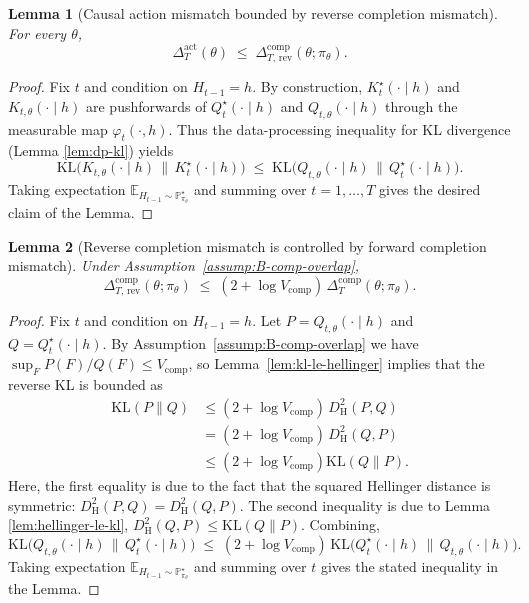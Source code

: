 \documentclass[11pt]{article}
\newtheorem{lemma}{Lemma}
\renewcommand{\P}{\mathbb{P}}
\providecommand{\E}{\mathbb{E}}
\begin{document}
\begin{lemma}[Causal action mismatch bounded by reverse completion mismatch]
\label{lemma:B12-act-by-rev-comp}
For every \(\theta\),
\[
\Delta_{T}^{\mathrm{act}}(\theta)
\;\le\;
\Delta^{\mathrm{comp}}_{T, \, \mathrm{rev}}(\theta;\pi_\theta).
\]
\end{lemma}

\begin{proof}
Fix \(t\) and condition on \(H_{t-1}=h\).
By construction, \(K^\star_t(\cdot\mid h)\) and \(K_{t,\theta}(\cdot\mid h)\) are pushforwards of
\(Q^\star_t(\cdot\mid h)\) and \(Q_{t,\theta}(\cdot\mid h)\) through the measurable map
\(\varphi_t(\cdot,h)\).
Thus the data-processing inequality for KL divergence (Lemma \ref{lem:dp-kl}) yields
\[
\mathrm{KL}\!\Big(
K_{t,\theta}(\cdot\mid h)\,\Big\|\,K^\star_t(\cdot\mid h)
\Big)
\;\le\;
\mathrm{KL}\!\Big(
Q_{t,\theta}(\cdot\mid h)\,\Big\|\,Q^\star_t(\cdot\mid h)
\Big).
\]
Taking expectation \(\E_{H_{t-1}\sim \P^\star_{\pi_\theta}}\) and summing over \(t=1,\dots,T\) gives the desired claim of the Lemma.
\end{proof}

\begin{lemma}[Reverse completion mismatch is controlled by forward completion mismatch]
\label{cor:B13-rev-by-fwd-comp}
Under Assumption~\ref{assump:B-comp-overlap},
\[
\Delta^{\mathrm{comp}}_{T, \, \mathrm{rev}}(\theta;\pi_\theta)
\;\le\;
(2+\log V_{\mathrm{comp}})\,
\Delta^{\mathrm{comp}}_{T}(\theta;\pi_\theta).
\]
\end{lemma}

\begin{proof}
Fix \(t\) and condition on \(H_{t-1}=h\).
Let \(P=Q_{t,\theta}(\cdot\mid h)\) and \(Q=Q^\star_t(\cdot\mid h)\).
By Assumption~\ref{assump:B-comp-overlap} we have \(\sup_{F}P(F)/Q(F)\le V_{\mathrm{comp}}\),
so Lemma~\ref{lem:kl-le-hellinger} implies that the reverse KL is bounded as
\begin{align*}
\mathrm{KL}(P\|Q) &\le
(2+\log V_{\mathrm{comp}})\,D^2_{\mathrm{H}}(P,Q) \\
&= (2+\log V_{\mathrm{comp}})\,D^2_{\mathrm{H}}(Q,P) \\
&\leq (2+\log V_{\mathrm{comp}})\mathrm{KL}(Q\|P).
\end{align*}
Here, the first equality is due to the fact that the squared Hellinger distance is symmetric: \(D^2_{\mathrm{H}}(P,Q)=D^2_{\mathrm{H}}(Q,P)\). The second inequality is due to Lemma \ref{lem:hellinger-le-kl}, \(D^2_{\mathrm{H}}(Q,P)\le \mathrm{KL}(Q\|P)\).
Combining, 
\[
\mathrm{KL}\!\Big(Q_{t,\theta}(\cdot\mid h)\,\big\|\,Q^\star_t(\cdot\mid h)\Big)
\;\le\;
(2+\log V_{\mathrm{comp}})\,
\mathrm{KL}\!\Big(Q^\star_t(\cdot\mid h)\,\big\|\,Q_{t,\theta}(\cdot\mid h)\Big).
\]
Taking expectation \(\E_{H_{t-1}\sim \P^\star_{\pi_\theta}}\) and summing over \(t\) gives the stated inequality in the Lemma.
\end{proof}
\end{document}
